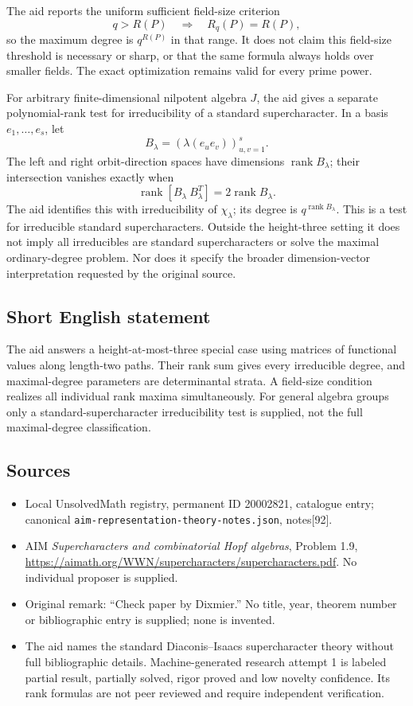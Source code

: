\documentclass[11pt]{article}
\begin{document}
The aid reports the uniform sufficient field-size criterion
\[
 q>R(P)\quad\Longrightarrow\quad R_q(P)=R(P),
\]
so the maximum degree is \(q^{R(P)}\) in that range. It does not claim this field-size threshold is necessary or sharp, or that the same formula always holds over smaller fields. The exact optimization remains valid for every prime power.

For arbitrary finite-dimensional nilpotent algebra \(J\), the aid gives a separate polynomial-rank test for irreducibility of a standard supercharacter. In a basis \(e_1,\ldots,e_s\), let
\[
 B_\lambda=(\lambda(e_ue_v))_{u,v=1}^s.
\]
The left and right orbit-direction spaces have dimensions \(\operatorname{rank}B_\lambda\); their intersection vanishes exactly when
\[
 \operatorname{rank}[B_\lambda\ B_\lambda^T]
                  =2\operatorname{rank}B_\lambda.
\]
The aid identifies this with irreducibility of \(\chi_\lambda\); its degree is \(q^{\operatorname{rank}B_\lambda}\). This is a test for irreducible standard supercharacters. Outside the height-three setting it does not imply all irreducibles are standard supercharacters or solve the maximal ordinary-degree problem. Nor does it specify the broader dimension-vector interpretation requested by the original source.
\subsection{Short English statement}
The aid answers a height-at-most-three special case using matrices of functional values along length-two paths. Their rank sum gives every irreducible degree, and maximal-degree parameters are determinantal strata. A field-size condition realizes all individual rank maxima simultaneously. For general algebra groups only a standard-supercharacter irreducibility test is supplied, not the full maximal-degree classification.
\subsection{Sources}
\begin{itemize}
\item Local UnsolvedMath registry, permanent ID 20002821, catalogue entry; canonical \texttt{aim-representation-theory-notes.json}, notes[92].
\item AIM \emph{Supercharacters and combinatorial Hopf algebras}, Problem 1.9, \url{https://aimath.org/WWN/supercharacters/supercharacters.pdf}. No individual proposer is supplied.
\item Original remark: ``Check paper by Dixmier.'' No title, year, theorem number or bibliographic entry is supplied; none is invented.
\item The aid names the standard Diaconis--Isaacs supercharacter theory without full bibliographic details. Machine-generated research attempt 1 is labeled partial result, partially solved, rigor proved and low novelty confidence. Its rank formulas are not peer reviewed and require independent verification.
\end{itemize}
\end{document}
